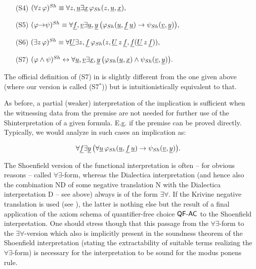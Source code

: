\begin{dfn}
\begin{enumerate}
\item[(S4)] $(\forall z \, \varphi)^{Sh} \equiv \forall  z,\underline{u} 
\exists \underline{x} \, \varphi_{Sh}(z,\underline{u},\underline{x}),$
\item[(S5)] 
$(\varphi{\to} \psi)^{Sh} 
\equiv \forall \underline{f}, \underline{v} \exists \underline{u}, \underline{y} \, \big(\varphi_{Sh}
(\underline{u},\underline{f}\, \underline{u}) \to \psi_{Sh}(\underline{v},\underline{y})\big),$
\item[(S6)] 
$(\exists z \,\varphi)^{Sh} \equiv \forall \underline{U} \exists z, \underline{f} \, 
\varphi_{Sh}(z,\underline{U} \,z\,\underline{f},\underline{f}(\underline{U}\,z\,\underline{f})),$
\item[(S7)] $(\varphi \wedge \psi)^{Sh} \leftrightarrow 
\forall \underline{u},\underline{v} \exists \underline{x}, \underline{y} \,
\big( \varphi_{Sh}(\underline{u},\underline{x}) \wedge \psi_{Sh}(\underline{v},\underline{y})\big).$ 
\end{enumerate}
\end{dfn}
\begin{remark} The official definition  of (S7) in \cite{streicherkohlenbach07} 
is slightly different from the one given above (where our version is called 
(S7$^*$)) 
but is intuitionistically equivalent to that.
\end{remark}
As before, a partial (weaker) interpretation of the implication is sufficient
when the witnessing data from the premise are not needed
for further use of the Sh\nbd interpretation of a given formula. E.g. if the
premise can be proved directly. Typically, we would analyze in such cases 
an implication as:


\[ \forall \underline{f} \exists \underline{y} \, \big( \forall \underline{u}\,
\varphi_{Sh}
(\underline{u},\underline{f}\,\underline{u}) \to \psi_{Sh}(\underline{v},\underline{y})\big).\]
\begin{remark} 
The Shoenfield version of the functional interpretation is often -- for 
obvious reasons -- called $\forall\exists$-form, whereas the Dialectica 
interpretation (and hence also the combination ND of some 
negative translation N with 
the Dialectica interpretation D -- see above) always is of the form $\exists\forall.$ 
If the Krivine negative translation is used (see 
\cite{streicherkohlenbach07}), 
the latter is nothing else but 
the result of a final application of the axiom schema of quantifier-free 
choice $\textsf{\upshape QF-}\textsf{\upshape AC}$ 
to the Shoenfield interpretation. One should stress though that this passage 
from the $\forall\exists$-form to the $\exists\forall$-version which  
also is implicitly present in the soundness theorem of the Shoenfield 
interpretation (stating the extractability of suitable terms realizing 
the $\forall\exists$-form) is necessary for the interpretation to be sound 
for the modus ponens rule.  
\end{remark}


